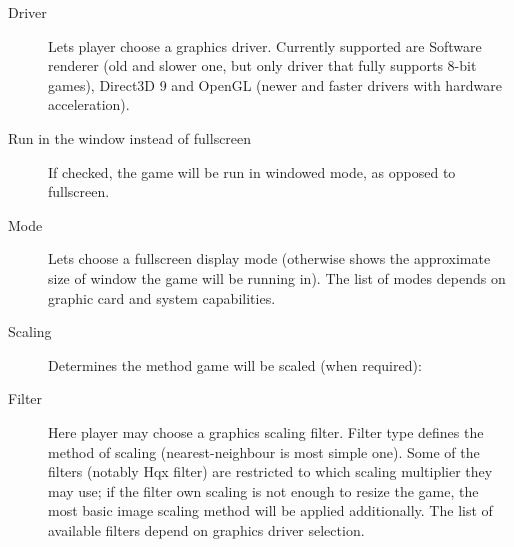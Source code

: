 \begin{description}
\item [Driver]
  Lets player choose a graphics driver. Currently supported are Software renderer (old and slower one, but only driver that fully supports 8-bit games),
Direct3D 9 and OpenGL (newer and faster drivers with hardware acceleration).
\item [Run in the window instead of fullscreen]
  If checked, the game will be run in windowed mode, as opposed to fullscreen.
\item [Mode]
  Lets choose a fullscreen display mode (otherwise shows the approximate size of
window the game will be running in). The list of modes depends on graphic card and
system capabilities.
\item [Scaling]
  Determines the method game will be scaled (when required):
\item [Filter]
  Here player may choose a graphics scaling filter. Filter type defines the method of
scaling (nearest-neighbour is most simple one). Some of the filters (notably Hqx filter) are restricted
to which scaling multiplier they may use; if the filter own scaling is not enough to resize the game,
the most basic image scaling method will be applied additionally.
  The list of available filters depend on graphics driver selection.
\end{description}

